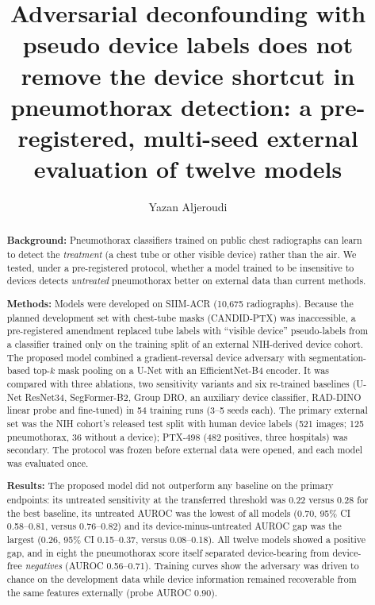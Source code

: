 \documentclass[final,3p]{elsarticle}
\begin{document}
\begin{frontmatter}

\title{Adversarial deconfounding with pseudo device labels does not remove the device shortcut in pneumothorax detection: a pre-registered, multi-seed external evaluation of twelve models}

\author{Yazan Aljeroudi}

\begin{abstract}
\textbf{Background:} Pneumothorax classifiers trained on public chest radiographs can learn to detect the \emph{treatment} (a chest tube or other visible device) rather than the air. We tested, under a pre-registered protocol, whether a model trained to be insensitive to devices detects \emph{untreated} pneumothorax better on external data than current methods.

\textbf{Methods:} Models were developed on SIIM-ACR (10{,}675 radiographs). Because the planned development set with chest-tube masks (CANDID-PTX) was inaccessible, a pre-registered amendment replaced tube labels with ``visible device'' pseudo-labels from a classifier trained only on the training split of an external NIH-derived device cohort. The proposed model combined a gradient-reversal device adversary with segmentation-based top-$k$ mask pooling on a U-Net with an EfficientNet-B4 encoder. It was compared with three ablations, two sensitivity variants and six re-trained baselines (U-Net ResNet34, SegFormer-B2, Group DRO, an auxiliary device classifier, RAD-DINO linear probe and fine-tuned) in 54 training runs (3--5 seeds each). The primary external set was the NIH cohort's released test split with human device labels (521 images; 125 pneumothorax, 36 without a device); PTX-498 (482 positives, three hospitals) was secondary. The protocol was frozen before external data were opened, and each model was evaluated once.

\textbf{Results:} The proposed model did not outperform any baseline on the primary endpoints: its untreated sensitivity at the transferred threshold was 0.22 versus 0.28 for the best baseline, its untreated AUROC was the lowest of all models (0.70, 95\% CI 0.58--0.81, versus 0.76--0.82) and its device-minus-untreated AUROC gap was the largest (0.26, 95\% CI 0.15--0.37, versus 0.08--0.18). All twelve models showed a positive gap, and in eight the pneumothorax score itself separated device-bearing from device-free \emph{negatives} (AUROC 0.56--0.71). Training curves show the adversary was driven to chance on the development data while device information remained recoverable from the same features externally (probe AUROC 0.90).


\end{abstract}
\end{frontmatter}
\end{document}

